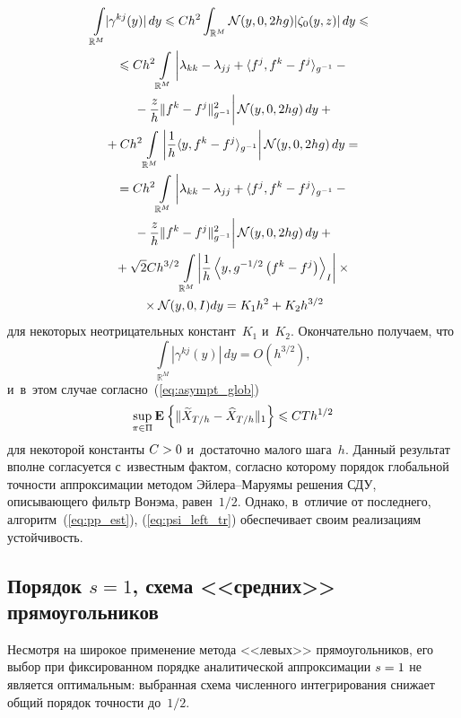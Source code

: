 \begin{multicols}{2}
 \noindent
  \begin{multline}
   \!\!\int\limits_{\mathbb{R}^M}\!\! |\gamma^{kj}(y)|\,dy 
   \leqslant  Ch^2\int_{\mathbb{R}^M}\mathcal{N}(y,0,2hg)|\zeta_0(y,z)|\,dy 
   \leqslant {}\hspace*{-1.41057pt}\\ 
   {}\leqslant
Ch^2\int\limits_{\mathbb{R}^M}
\left|
\vphantom{\fr{z}{h}}
\lambda_{kk}-\lambda_{jj}
 +\langle f^j,f^k-f^j\rangle_{g^{-1}}- {}\right.\\
\left. {}-\fr{z}{h}\|f^k-f^j\|^2_{g^{-1}}\right|
\mathcal{N}(y,0,2hg)\,dy +{} \\ 
{}+ 
Ch^2\int\limits_{\mathbb{R}^M}
\left|\fr{1}{h}\langle y,f^k-f^j\rangle_{g^{-1}}\right|
\mathcal{N}(y,0,2hg)\,dy ={} \\ 
{}= 
Ch^2\int\limits_{\mathbb{R}^M}
\left|
\vphantom{\fr{z}{h}}
\lambda_{kk}-\lambda_{jj}
 +\langle f^j,f^k-f^j\rangle_{g^{-1}}- {}\right.\\
\left. {}-\fr{z}{h}\|f^k-f^j\|^2_{g^{-1}}\right|
\mathcal{N}(y,0,2hg)\,dy +{} \\ 
{}+ 
\sqrt{2}Ch^{{3}/{2}}\int\limits_{\mathbb{R}^M}\!
\left|\fr{1}{h}\left\langle y,g^{-{1}/{2}}
\left(f^k-f^j\right)\right\rangle_{I}\right|\times{}\\
{}\times
\mathcal{N}(y,0,I)dy = K_1h^2 + K_2 h^{{3}/{2}}
\label{eq:ineq_2}
 \end{multline}
 для некоторых неотрицательных констант~$K_1$ и~$K_2$.
 Окончательно получаем, что 
 $$
 \int\limits_{\mathbb{R}^M}|\gamma^{kj}(y)|\,dy =O\left(h^{{3}/{2}}\right),
 $$
  и~в~этом 
 случае согласно~(\ref{eq:asympt_glob}) 
 $$\mathop{\mathrm{sup}}\limits_{\pi \in \Pi}
 \mathbf{E}_{  }\left\{ \mathop{\|\widetilde{X}_{T/h} - \widehat{X}_{T/h}\|_1} \right\} 
 \leqslant CT h^{{1}/{2}}
 $$ 
 для некоторой константы $C \hm> 0$ и~достаточно малого шага~$h$. 
 Данный результат вполне согласуется с~известным фактом, согласно 
 которому порядок глобальной точности аппроксимации методом Эй\-ле\-ра--Ма\-ру\-ямы 
  решения СДУ, описывающего 
  фильтр Во\-нэ\-ма, равен~${1}/{2}$. Однако, в~отличие от последнего, 
  алгоритм~(\ref{eq:pp_est}), (\ref{eq:psi_left_tr}) обеспечивает 
  своим реализациям устойчивость.
  
  \subsection{Порядок $s=1$, схема <<средних>> прямоугольников}
  
   Несмотря на широкое применение метода <<левых>> прямоугольников, 
   его выбор при фиксированном порядке аналитической аппроксимации $s\hm=1$ 
   не является оптимальным: выбранная схема чис\-лен\-но\-го интегрирования снижает 
   общий порядок точности до~${1}/{2}$.


\end{multicols}
